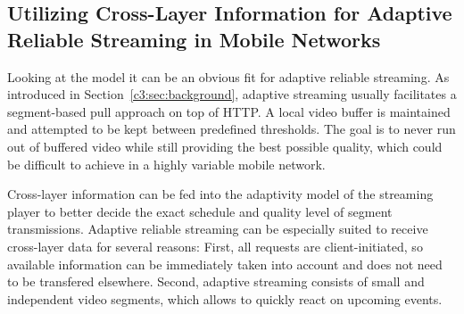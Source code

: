 \subsection{Utilizing Cross-Layer Information for Adaptive Reliable Streaming in Mobile Networks}

Looking at the model it can be an obvious fit for adaptive reliable streaming. As introduced in Section~\ref{c3:sec:background}, adaptive streaming usually facilitates a segment-based pull approach on top of \gls{HTTP}. A local video buffer is maintained and attempted to be kept between predefined thresholds. The goal is to never run out of buffered video while still providing the best possible quality, which could be difficult to achieve in a highly variable mobile network.

Cross-layer information can be fed into the adaptivity model of the streaming player to better decide the exact schedule and quality level of segment transmissions. Adaptive reliable streaming can be especially suited to receive cross-layer data for several reasons: First, all requests are client-initiated, so available information can be immediately taken into account and does not need to be transfered elsewhere. Second, adaptive streaming consists of small and independent video segments, which allows to quickly react on upcoming events.

